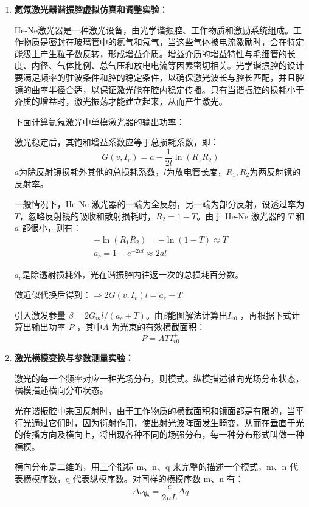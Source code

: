 \documentclass[dvipsnames, svgnames,a4paper,11pt]{article}
\begin{document}
	\begin{enumerate}
		\item \textbf{氦氖激光器谐振腔虚拟仿真和调整实验：}

			He-Ne激光器是一种激光设备，由光学谐振腔、工作物质和激励系统组成。工作物质是密封在玻璃管中的氦气和氖气，当这些气体被电流激励时，会在特定能级上产生粒子数反转，形成增益介质。增益介质的增益特性与毛细管的长度、内径、气体比例、总气压和放电电流等因素密切相关。光学谐振腔的设计要满足频率的驻波条件和腔的稳定条件，以确保激光波长与腔长匹配，并且腔镜的曲率半径合适，以保证激光能在腔内稳定传播。只有当谐振腔的损耗小于介质的增益时，激光振荡才能建立起来，从而产生激光。

			下面计算氦氖激光中单模激光器的输出功率：

			激光稳定后，其饱和增益系数应等于总损耗系数，即：
			\[
				G(v, I_v) = a - \frac{1}{2l} \ln(R_1 R_2)
			\]
			$a$为除反射镜损耗外其他的总损耗系数，$l$为放电管长度，$R_1, R_2$为两反射镜的反射率。

			一般情况下，He-Ne 激光器的一端为全反射，另一端为部分反射，设透过率为$T$，忽略反射镜的吸收和散射损耗时，$R_2 = 1 - T$。由于 He-Ne 激光器的 $T$ 和 $a$ 都很小，则有：
			\begin{align}
				-\ln(R_1 R_2) = -\ln(1 - T ) \approx T	\nonumber \\
				a_c = 1 - e^{-2al} \approx 2al	\nonumber
			\end{align}

			$a_c$是除透射损耗外，光在谐振腔内往返一次的总损耗百分数。
			
			做近似代换后得到：$\Rightarrow 2 G(v, I_v) l = a_c + T $

			引入激发参量 $\beta = 2 G_m l / (a_c + T)$。由$\beta$能图解法计算出$I_{v0}$ ，再根据下式计算出输出功率 $P$ ，其中$A$ 为光束的有效横截面积：
			\[
				P = A T I_{v0}^+
			\]

			


		\item \textbf{激光横模变换与参数测量实验：}
			
			激光的每一个频率对应一种光场分布，则模式。纵模描述轴向光场分布状态，横模描述横向分布状态。

			光在谐振腔中来回反射时，由于工作物质的横截面积和镜面都是有限的，当平行光通过它们时，因为衍射作用，使出射光波阵面发生畸变，从而在垂直于光的传播方向及横向上，将出现各种不同的场强分布，每一种分布形式叫做一种横模。

			横向分布是二维的，用三个指标 m、n、q 来完整的描述一个模式，m、n 代表横模序数，q 代表纵模序数。对同样的横模序数 m、n 有：
			\[
				\Delta \nu_{\text{纵}} = \frac{c}{2 \mu L} \Delta q
			\]


\end{enumerate}
\end{document}
